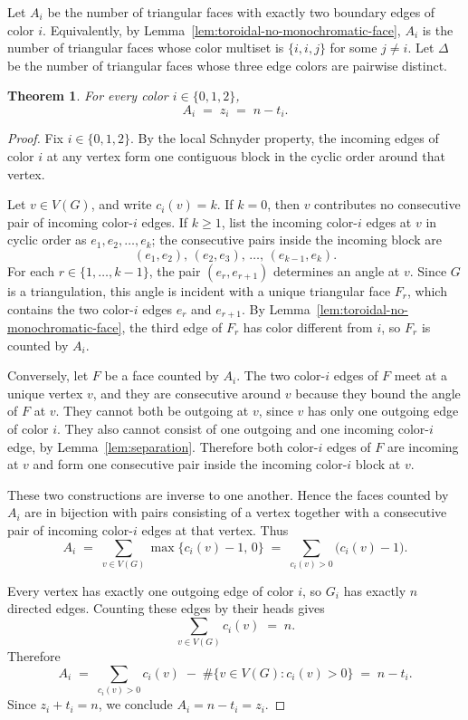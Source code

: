 \documentclass[11pt]{amsart}
\newcommand{\Zthree}{\{0,1,2\}}
\theoremstyle{plain}
\newtheorem{theorem}{Theorem}
\theoremstyle{definition}
\theoremstyle{remark}
\begin{document}
Let $A_i$ be the number of triangular faces with exactly two boundary edges of color $i$. Equivalently, by Lemma~\ref{lem:toroidal-no-monochromatic-face}, $A_i$ is the number of triangular faces whose color multiset is $\{i, i, j\}$ for some $j \neq i$. Let $\Delta$ be the number of triangular faces whose three edge colors are pairwise distinct.

\begin{theorem}
\label{thm:toroidal-source-face}
For every color $i \in \Zthree$,
\[
  A_i \;=\; z_i \;=\; n - t_i.
\]
\end{theorem}

\begin{proof}
Fix $i \in \Zthree$. By the local Schnyder property, the incoming edges of color $i$ at any vertex form one contiguous block in the cyclic order around that vertex.

Let $v \in V(G)$, and write $c_i(v) = k$. If $k = 0$, then $v$ contributes no consecutive pair of incoming color-$i$ edges. If $k \ge 1$, list the incoming color-$i$ edges at $v$ in cyclic order as $e_1, e_2, \dots, e_k$; the consecutive pairs inside the incoming block are
\[
  (e_1, e_2),\, (e_2, e_3),\, \dots,\, (e_{k-1}, e_k).
\]
For each $r \in \{1, \dots, k-1\}$, the pair $(e_r, e_{r+1})$ determines an angle at $v$. Since $G$ is a triangulation, this angle is incident with a unique triangular face $F_r$, which contains the two color-$i$ edges $e_r$ and $e_{r+1}$. By Lemma~\ref{lem:toroidal-no-monochromatic-face}, the third edge of $F_r$ has color different from $i$, so $F_r$ is counted by $A_i$.

Conversely, let $F$ be a face counted by $A_i$. The two color-$i$ edges of $F$ meet at a unique vertex $v$, and they are consecutive around $v$ because they bound the angle of $F$ at $v$. They cannot both be outgoing at $v$, since $v$ has only one outgoing edge of color $i$. They also cannot consist of one outgoing and one incoming color-$i$ edge, by Lemma~\ref{lem:separation}. Therefore both color-$i$ edges of $F$ are incoming at $v$ and form one consecutive pair inside the incoming color-$i$ block at $v$.

These two constructions are inverse to one another. Hence the faces counted by $A_i$ are in bijection with pairs consisting of a vertex together with a consecutive pair of incoming color-$i$ edges at that vertex. Thus
\[
  A_i
  \;=\;
  \sum_{v \in V(G)} \max\{c_i(v) - 1,\, 0\}
  \;=\;
  \sum_{c_i(v) > 0} \bigl(c_i(v) - 1\bigr).
\]

Every vertex has exactly one outgoing edge of color $i$, so $G_i$ has exactly $n$ directed edges. Counting these edges by their heads gives
\[
  \sum_{v \in V(G)} c_i(v) \;=\; n.
\]
Therefore
\[
  A_i
  \;=\;
  \sum_{c_i(v) > 0} c_i(v) \;-\; \#\{v \in V(G) : c_i(v) > 0\}
  \;=\;
  n - t_i.
\]
Since $z_i + t_i = n$, we conclude $A_i = n - t_i = z_i$.
\end{proof}
\end{document}
